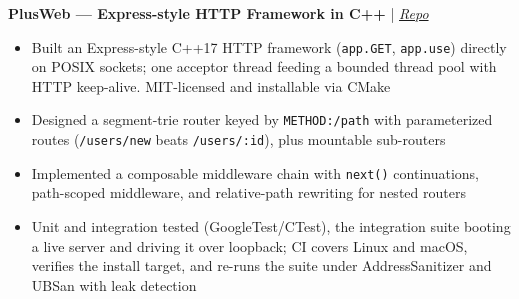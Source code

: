 \documentclass[10pt,letterpaper]{article}
\begin{document}
\vspace{0.2em}
\noindent\textbf{PlusWeb --- Express-style HTTP Framework in C++} | \href{https://github.com/Amsozzer1/PlusWeb}{\textit{Repo}}
\begin{itemize}[leftmargin=14pt]
  \item Built an Express-style C++17 HTTP framework (\texttt{app.GET}, \texttt{app.use}) directly on POSIX sockets; one acceptor thread feeding a bounded thread pool with HTTP keep-alive. MIT-licensed and installable via CMake
  \item Designed a segment-trie router keyed by \texttt{METHOD:/path} with parameterized routes (\texttt{/users/new} beats \texttt{/users/:id}), plus mountable sub-routers
  \item Implemented a composable middleware chain with \texttt{next()} continuations, path-scoped middleware, and relative-path rewriting for nested routers
  \item Unit and integration tested (GoogleTest/CTest), the integration suite booting a live server and driving it over loopback; CI covers Linux and macOS, verifies the install target, and re-runs the suite under AddressSanitizer and UBSan with leak detection
\end{itemize}
\end{document}

